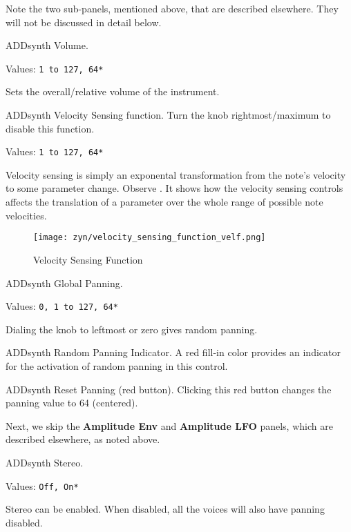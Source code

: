    Note the two sub-panels, mentioned above, that are described elsewhere.
   They will not be discussed in detail below.

   \setcounter{ItemCounter}{0}      %

   ADDsynth Volume.

   Values: \texttt{1 to 127, 64*}

   Sets the overall/relative volume of the instrument.

   ADDsynth Velocity Sensing function.
   Turn the knob rightmost/maximum to disable this function.

   Values: \texttt{1 to 127, 64*}

   Velocity sensing is simply an exponental transformation from the note’s
   velocity to some parameter change.
   Observe .
   It shows how the velocity sensing controls affects the translation of a
   parameter over the whole range of possible note velocities.

\begin{figure}[H]
   \centering 
   \texttt{[image: zyn/velocity\_sensing\_function\_velf.png]}
   \caption{Velocity Sensing Function}
   \label{fig:velocity_sensing_function}
\end{figure}

   ADDsynth Global Panning.

   Values: \texttt{0, 1 to 127, 64*}

   Dialing the knob to leftmost or zero gives random panning.

   ADDsynth Random Panning Indicator.
   A red fill-in color provides an indicator for the activation of random
   panning in this control.

   ADDsynth Reset Panning (red button).
   Clicking this red button changes the panning value to 64 (centered).

   Next, we skip the \textbf{Amplitude Env} and \textbf{Amplitude LFO}
   panels, which are described elsewhere, as noted above.

   ADDsynth Stereo.

   Values: \texttt{Off, On*}

   Stereo can be enabled.
   When disabled, all the voices will also have panning disabled.

